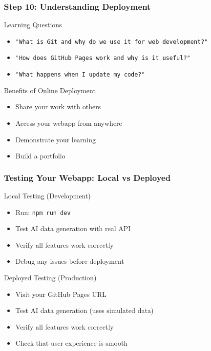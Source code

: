 \documentclass[aspectratio=169]{beamer}
\begin{document}
\begin{frame}
\frametitle{Step 10: Understanding Deployment}
\begin{alertblock}{Learning Questions}
\begin{itemize}
\item \texttt{"What is Git and why do we use it for web development?"}
\item \texttt{"How does GitHub Pages work and why is it useful?"}
\item \texttt{"What happens when I update my code?"}
\end{itemize}
\end{alertblock}

\begin{exampleblock}{Benefits of Online Deployment}
\begin{itemize}
\item Share your work with others
\item Access your webapp from anywhere
\item Demonstrate your learning
\item Build a portfolio
\end{itemize}
\end{exampleblock}
\end{frame}

\begin{frame}
\frametitle{Testing Your Webapp: Local vs Deployed}
\begin{alertblock}{Local Testing (Development)}
\begin{itemize}
\item Run: \texttt{npm run dev}
\item Test AI data generation with real API
\item Verify all features work correctly
\item Debug any issues before deployment
\end{itemize}
\end{alertblock}

\begin{exampleblock}{Deployed Testing (Production)}
\begin{itemize}
\item Visit your GitHub Pages URL
\item Test AI data generation (uses simulated data)
\item Verify all features work correctly
\item Check that user experience is smooth
\end{itemize}
\end{exampleblock}

\end{frame}
\end{document}
